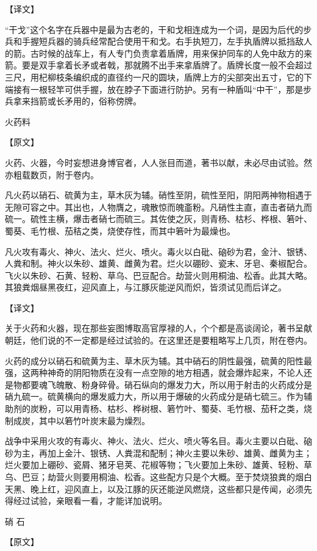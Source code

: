 \documentclass[12pt,UTF8]{ctexbook}
\begin{document}
【译文】

“干戈”这个名字在兵器中是最为古老的，干和戈相连成为一个词，是因为后代的步兵和手握短兵器的骑兵经常配合使用干和戈。右手执短刀，左手执盾牌以抵挡敌人的箭。古时候的战车上，有人专门负责拿着盾牌，用来保护同车的人免中敌方的来箭。要是双手拿着长矛或者戟，那就腾不出手来拿盾牌了。盾牌长度一般不会超过三尺，用杞柳枝条编织成的直径约一尺的圆块，盾牌上方的尖部突出五寸，它的下端接有一根轻竿可供手握，放在脖子下面进行防护。另有一种盾叫“中干”，那是步兵拿来挡箭或长矛用的，俗称傍牌。

火药料

【原文】

火药、火器，今时妄想进身博官者，人人张目而道，著书以献，未必尽由试验。然亦粗载数页，附于卷内。

凡火药以硝石、硫黄为主，草木灰为辅。硝性至阴，硫性至阳，阴阳两神物相遇于无隙可容之中。其出也，人物膺之，魂散惊而魄齑粉。凡硝性主直，直击者硝九而硫一。硫性主横，爆击者硝七而硫三。其佐使之灰，则青杨、枯杉、桦根、箬叶、蜀葵、毛竹根、茄秸之类，烧使存性，而其中箬叶为最燥也。

凡火攻有毒火、神火、法火、烂火、喷火。毒火以白砒、硇砂为君，金汁、银锈、人粪和制。神火以朱砂、雄黄、雌黄为君。烂火以硼砂、瓷末、牙皂、秦椒配合。飞火以朱砂、石黄、轻粉、草乌、巴豆配合。劫营火则用桐油、松香。此其大略。其狼粪烟昼黑夜红，迎风直上，与江豚灰能逆风而炽，皆须试见而后详之。

【译文】

关于火药和火器，现在那些妄图博取高官厚禄的人，个个都是高谈阔论，著书呈献朝廷，他们说的不一定都是经过试验的。在这里还是要粗略写上几页，附在卷内。

火药的成分以硝石和硫黄为主、草木灰为辅。其中硝石的阴性最强，硫黄的阳性最强，这两种神奇的阴阳物质在没有一点空隙的地方相遇，就会爆炸起来，不论人还是物都要魂飞魄散、粉身碎骨。硝石纵向的爆发力大，所以用于射击的火药成分是硝九硫一。硫黄横向的爆发威力大，所以用于爆破的火药成分是硝七硫三。作为辅助剂的炭粉，可以用青杨、枯杉、桦树根、箬竹叶、蜀葵、毛竹根、茄秆之类，烧制成炭，其中以箬竹叶炭末最为燥烈。

战争中采用火攻的有毒火、神火、法火、烂火、喷火等名目。毒火主要以白砒、硇砂为主，再加上金汁、银锈、人粪混和配制；神火主要以朱砂、雄黄、雌黄为主；烂火要加上硼砂、瓷屑、猪牙皂荚、花椒等物；飞火要加上朱砂、雄黄、轻粉、草乌、巴豆；劫营火则要用桐油、松香。这些配方只是个大概。至于焚烧狼粪的烟白天黑、晚上红，迎风直上，以及江豚的灰还能逆风燃烧，这些都只是传闻，必须先得经过试验，亲眼看一看，才能详加说明。

硝 石

【原文】
\end{document}
